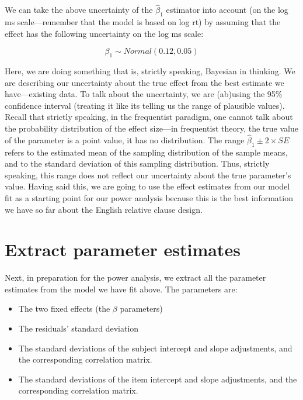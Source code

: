 \documentclass[
  12pt,
]{krantz}
\providecommand{\tightlist}{%
  \setlength{\itemsep}{0pt}\setlength{\parskip}{0pt}}
\theoremstyle{definition}
\theoremstyle{definition}
\theoremstyle{definition}
\theoremstyle{definition}
\theoremstyle{remark}
\begin{document}
We can take the above uncertainty of the \(\hat\beta_1\) estimator into account (on the log ms scale---remember that the model is based on log rt) by assuming that the effect has the following uncertainty on the log ms scale:

\begin{equation}
\beta_1 \sim Normal(0.12,0.05)
\end{equation}

Here, we are doing something that is, strictly speaking, Bayesian in thinking. We are describing our uncertainty about the true effect from the best estimate we have---existing data. To talk about the uncertainty, we are (ab)using the 95\% confidence interval (treating it like its telling us the range of plausible values). Recall that strictly speaking, in the frequentist paradigm, one cannot talk about the probability distribution of the effect size---in frequentist theory, the true value of the parameter is a point value, it has no distribution. The range \(\hat\beta_1 \pm 2\times SE\) refers to the estimated mean of the sampling distribution of the sample means, and to the standard deviation of this sampling distribution. Thus, strictly speaking, this range does not reflect our uncertainty about the true parameter's value. Having said this, we are going to use the effect estimates from our model fit as a starting point for our power analysis because this is the best information we have so far about the English relative clause design.

\hypertarget{extract-parameter-estimates}{%
\section{Extract parameter estimates}\label{extract-parameter-estimates}}

Next, in preparation for the power analysis, we extract all the parameter estimates from the model we have fit above. The parameters are:

\begin{itemize}
\tightlist
\item
  The two fixed effects (the \(\beta\) parameters)
\item
  The residuals' standard deviation
\item
  The standard deviations of the subject intercept and slope adjustments, and the corresponding correlation matrix.
\item
  The standard deviations of the item intercept and slope adjustments, and the corresponding correlation matrix.
\end{itemize}
\end{document}
